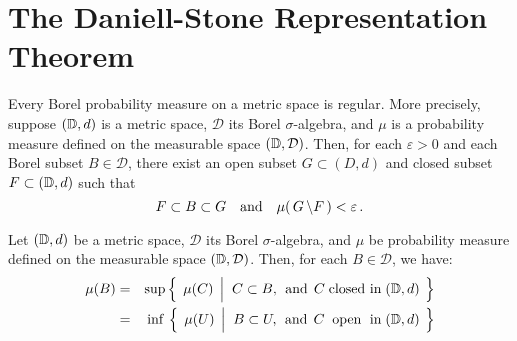 

\section{The Daniell-Stone Representation Theorem}
\setcounter{theorem}{0}
\setcounter{equation}{0}


\renewcommand{\theenumi}{\roman{enumi}}
\renewcommand{\labelenumi}{\textnormal{(\theenumi)}$\;\;$}


\begin{theorem}
\mbox{}\vskip 0.1cm
\noindent
Every Borel probability measure on a metric space is regular.
More precisely, suppose $(\mathbb{D},d)$ is a metric space, $\mathcal{D}$ its Borel $\sigma$-algebra,
and $\mu$ is a probability measure defined on the measurable space $(\mathbb{D},\mathcal{D})$.
Then, for each $\varepsilon > 0$ and each Borel subset $B \in \mathcal{D}$, there exist
an open subset $G \subset (D,d)$ and closed subset $F \subset (\mathbb{D},d)$ such that
\begin{equation*}
F \subset B \subset G
\quad\textnormal{and}\quad
\mu\!\left(\,G \,\backslash F\,\right) < \varepsilon\,.
\end{equation*} 
\end{theorem}


\begin{corollary}
\mbox{}\vskip 0.1cm
\noindent
Let $(\mathbb{D},d)$ be a metric space, $\mathcal{D}$ its Borel $\sigma$-algebra, and
$\mu$ be probability measure defined on the measurable space $(\mathbb{D},\mathcal{D})$.
Then, for each $B \in \mathcal{D}$, we have:
\begin{eqnarray*}
\mu(B)
& = &
	\sup\left\{\;\,\mu(C)\;\left\vert\;\;
		C \overset{{\color{white}.}}{\subset} B,
		\;\,\textnormal{and}\;\,
		C \;\textnormal{closed in}\; (\D,d)
	\right.\;\right\}
\\
& = &
	\,\inf\,\left\{\;\,\mu(U)\;\left\vert\;\;
		B \overset{{\color{white}.}}{\subset} U,
		\;\,\textnormal{and}\;\,
		C \;\textnormal{\;open\; in}\; (\D,d)
	\right.\;\right\}
\end{eqnarray*} 
\end{corollary}

